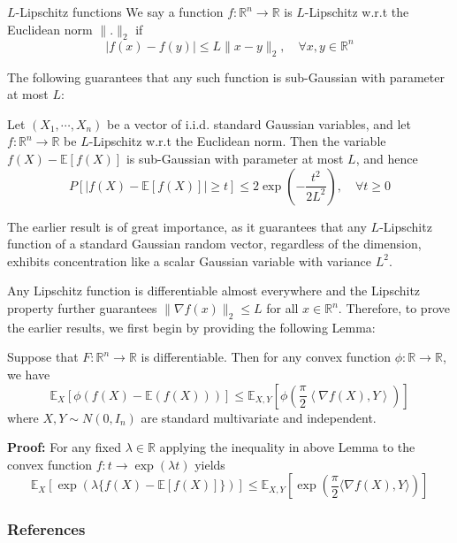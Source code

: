\documentclass[10pt,handout,english]{beamer}
\newcommand{\E}{\mathbb{E}}
\newcommand{\R}{\mathbb{R}}
\newcommand{\1}{\mathbbm{1}}
\begin{document}
\begin{frame}[allowframebreaks]
\begin{block}{$L$-Lipschitz functions}
We say a function $f:\R^n\to\R$ is $L$-Lipschitz w.r.t the Euclidean norm $\lVert.\rVert_2$ if
\[
\lvert f(x)-f(y)\rvert\leq L\lVert x-y\rVert_2,\quad\forall x,y\in\R^n
\]
\end{block}
The following guarantees that any such function is sub-Gaussian with parameter at most $L$:
\begin{block}{}
Let $(X_1,\cdots,X_n)$ be a vector of i.i.d. standard Gaussian variables, and let $f:\R^n\to\R$ be $L$-Lipschitz w.r.t the Euclidean norm. Then the variable $f(X)-\E[f(X)]$ is sub-Gaussian with parameter at most $L$, and hence
\[
P[\lvert f(X)-\E[f(X)]\rvert\geq t]\leq 2\exp\left(-\frac{t^2}{2L^2}\right),\quad\forall t\geq0
\]
\end{block}

The earlier result is of great importance, as it guarantees that any $L$-Lipschitz function of a standard  Gaussian random vector, regardless of the dimension, exhibits concentration like a scalar Gaussian variable with variance $L^2$. 

Any Lipschitz function is differentiable almost everywhere and the Lipschitz property further guarantees $\lVert\nabla f(x)\rVert_2\leq L$ for all $x\in\R^n$. Therefore, to prove the earlier results, we first begin by providing the following Lemma:
\begin{lemma}
Suppose that $F:\R^n\to\R$ is differentiable. Then for any convex function $\phi:\R\to\R$, we have
\[
\E_X[\phi(f(X)-\E(f(X)))]\leq\E_{X,Y}\left[\phi\left(\frac{\pi}{2}\left\langle\nabla f(X),Y\right\rangle\right)\right]
\]
where $X,Y\sim N(0,I_n)$ are standard multivariate and independent.
\end{lemma}

\textbf{Proof:}
For any fixed $\lambda\in\R$ applying the inequality in above Lemma to the convex function $f: t\to \exp(\lambda t)$ yields
 \[
\E_{X}[\exp(\lambda\{f(X)- \E[f(X)]\})]\leq \E_{X,Y}\left[\exp\left(\frac{\pi}{2}\langle \nabla f(X),Y \rangle\right)\right]
\]

\end{frame}




\begin{frame}[allowframebreaks]
\frametitle{References}


\end{frame}
\end{document}
